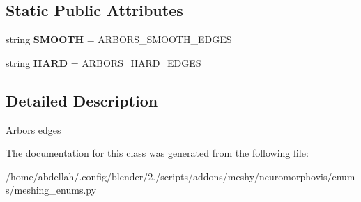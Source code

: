 \subsection*{Static Public Attributes}
\begin{DoxyCompactItemize}
\item 
string {\bfseries S\+M\+O\+O\+TH} = \textquotesingle{}A\+R\+B\+O\+R\+S\+\_\+\+S\+M\+O\+O\+T\+H\+\_\+\+E\+D\+G\+ES\textquotesingle{}\hypertarget{classmeshy_1_1neuromorphovis_1_1enums_1_1meshing__enums_1_1Meshing_1_1Edges_a05d4b8857391562cacc1c272c3dd6803}{}\label{classmeshy_1_1neuromorphovis_1_1enums_1_1meshing__enums_1_1Meshing_1_1Edges_a05d4b8857391562cacc1c272c3dd6803}

\item 
string {\bfseries H\+A\+RD} = \textquotesingle{}A\+R\+B\+O\+R\+S\+\_\+\+H\+A\+R\+D\+\_\+\+E\+D\+G\+ES\textquotesingle{}\hypertarget{classmeshy_1_1neuromorphovis_1_1enums_1_1meshing__enums_1_1Meshing_1_1Edges_a3c77653d9bd5093975ea622d0b75dbc2}{}\label{classmeshy_1_1neuromorphovis_1_1enums_1_1meshing__enums_1_1Meshing_1_1Edges_a3c77653d9bd5093975ea622d0b75dbc2}

\end{DoxyCompactItemize}


\subsection{Detailed Description}


\begin{DoxyVerb}Arbors edges
\end{DoxyVerb}
 

The documentation for this class was generated from the following file\+:\begin{DoxyCompactItemize}
\item 
/home/abdellah/.\+config/blender/2./scripts/addons/meshy/neuromorphovis/enums/meshing\+\_\+enums.\+py\end{DoxyCompactItemize}
